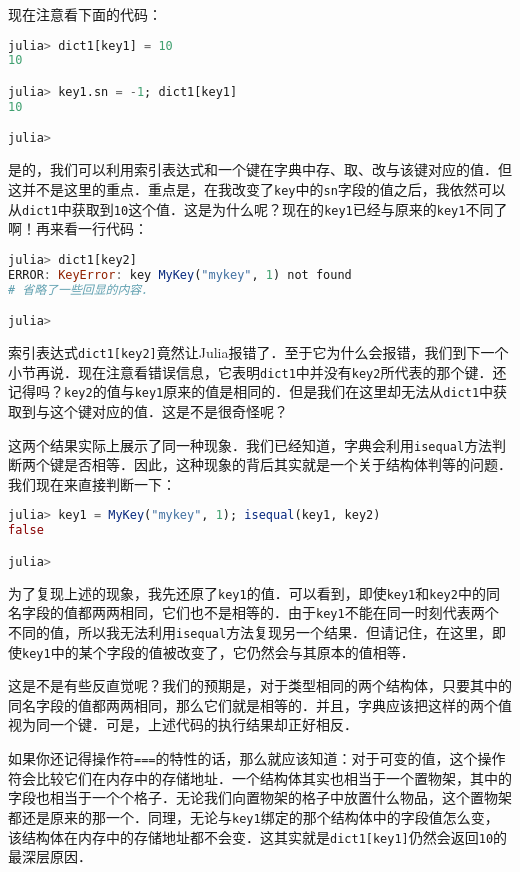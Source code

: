 现在注意看下面的代码：
\begin{lstlisting}[language=julia]
julia> dict1[key1] = 10
10

julia> key1.sn = -1; dict1[key1]
10

julia>
\end{lstlisting}

是的，我们可以利用索引表达式和一个键在字典中存、取、改与该键对应的值．但这并不是这里的重点．重点是，在我改变了\verb|key|中的\verb|sn|字段的值之后，我依然可以从\verb|dict1|中获取到\verb|10|这个值．这是为什么呢？现在的\verb|key1|已经与原来的\verb|key1|不同了啊！再来看一行代码：
\begin{lstlisting}[language=julia]
julia> dict1[key2]
ERROR: KeyError: key MyKey("mykey", 1) not found
# 省略了一些回显的内容．

julia> 
\end{lstlisting}

索引表达式\verb|dict1[key2]|竟然让Julia报错了．至于它为什么会报错，我们到下一个小节再说．现在注意看错误信息，它表明\verb|dict1|中并没有\verb|key2|所代表的那个键．还记得吗？\verb|key2|的值与\verb|key1|原来的值是相同的．但是我们在这里却无法从\verb|dict1|中获取到与这个键对应的值．这是不是很奇怪呢？

这两个结果实际上展示了同一种现象．我们已经知道，字典会利用\verb|isequal|方法判断两个键是否相等．因此，这种现象的背后其实就是一个关于结构体判等的问题．我们现在来直接判断一下：
\begin{lstlisting}[language=julia]
julia> key1 = MyKey("mykey", 1); isequal(key1, key2)
false

julia> 
\end{lstlisting}

为了复现上述的现象，我先还原了\verb|key1|的值．可以看到，即使\verb|key1|和\verb|key2|中的同名字段的值都两两相同，它们也不是相等的．由于\verb|key1|不能在同一时刻代表两个不同的值，所以我无法利用\verb|isequal|方法复现另一个结果．但请记住，在这里，即使\verb|key1|中的某个字段的值被改变了，它仍然会与其原本的值相等．

这是不是有些反直觉呢？我们的预期是，对于类型相同的两个结构体，只要其中的同名字段的值都两两相同，那么它们就是相等的．并且，字典应该把这样的两个值视为同一个键．可是，上述代码的执行结果却正好相反．

如果你还记得操作符\verb|===|的特性的话，那么就应该知道：对于可变的值，这个操作符会比较它们在内存中的存储地址．一个结构体其实也相当于一个置物架，其中的字段也相当于一个个格子．无论我们向置物架的格子中放置什么物品，这个置物架都还是原来的那一个．同理，无论与\verb|key1|绑定的那个结构体中的字段值怎么变，该结构体在内存中的存储地址都不会变．这其实就是\verb|dict1[key1]|仍然会返回\verb|10|的最深层原因．

